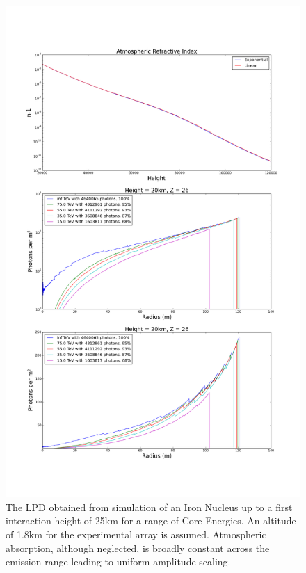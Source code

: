 \documentclass{article}
\begin{document}
\begin{figure}
\begin{center}
\includegraphics[height=0.9\textheight]{simulatedlpd}
\caption{The LPD obtained from simulation of an Iron Nucleus up to a first interaction height of 25km for a range of Core Energies. An altitude of 1.8km for the experimental array is assumed. Atmospheric absorption, although neglected, is broadly constant across the emission range leading to uniform amplitude scaling.}
\label{fig:lpd}
\end{center}
\end{figure}
\end{document}
